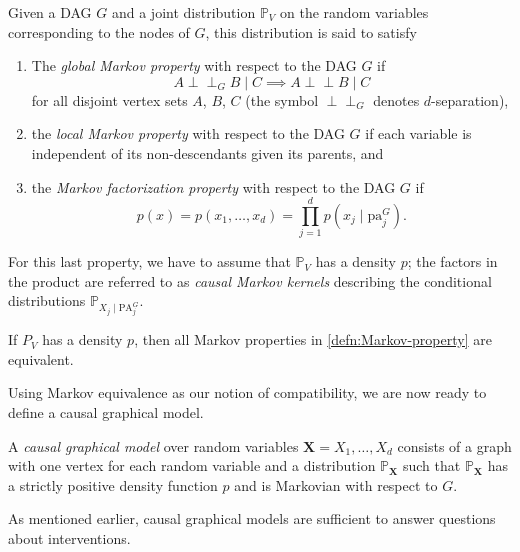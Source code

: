 \documentclass[../main.tex]{subfiles}
\begin{document}
    \begin{defn}
    \label{defn:Markov-property}
    Given a DAG $G$ and a joint distribution $\mathbb{P}_V$ on the random variables corresponding to the nodes of $G$, this distribution is said to satisfy

    \begin{enumerate}
        \item The \emph{global Markov property} with respect to the DAG $G$ if
        \[
        A \perp\!\!\!\perp_G B \mid C \implies A \perp\!\!\!\perp B \mid C
        \]
        for all disjoint vertex sets $A$, $B$, $C$ (the symbol $\perp\!\!\!\perp_G$ denotes $d$-separation),
        
        \item the \emph{local Markov property} with respect to the DAG $G$ if each variable is independent of its non-descendants given its parents, and
        
        \item the \emph{Markov factorization property} with respect to the DAG $G$ if
        \[
        p(x) = p(x_1, \ldots, x_d) = \prod_{j=1}^{d} p(x_j \mid \text{pa}_j^G).
        \]
    \end{enumerate}
    For this last property, we have to assume that $\mathbb{P}_V$ has a density $p$; the factors in the product are referred to as \emph{causal Markov kernels} describing the conditional distributions $\mathbb{P}_{X_j \mid \text{PA}_j^G}$.
    \end{defn}
    \begin{thm}
    \label{thm:markov-equivalence}
        If $P_V$ has a density $p$, then all Markov properties in \autoref{defn:Markov-property} are equivalent.
    \end{thm}
    Using Markov equivalence as our notion of compatibility, we are now ready to define a causal graphical model. 
    \begin{defn}
    \label{defn:Causal-graphical-model}
        A \emph{causal graphical model} over random variables ${\mathbf{X} = X_1,\dots, X_d}$ consists of a graph with one vertex for each random variable and a distribution ${\mathbb{P}_\mathbf{X}}$ such that ${\mathbb{P}_\mathbf{X}}$ has a strictly positive density function ${p}$ and is Markovian with respect to ${G}$. 
    \end{defn}
    As mentioned earlier, causal graphical models are sufficient to answer questions about interventions. 
\end{document}
